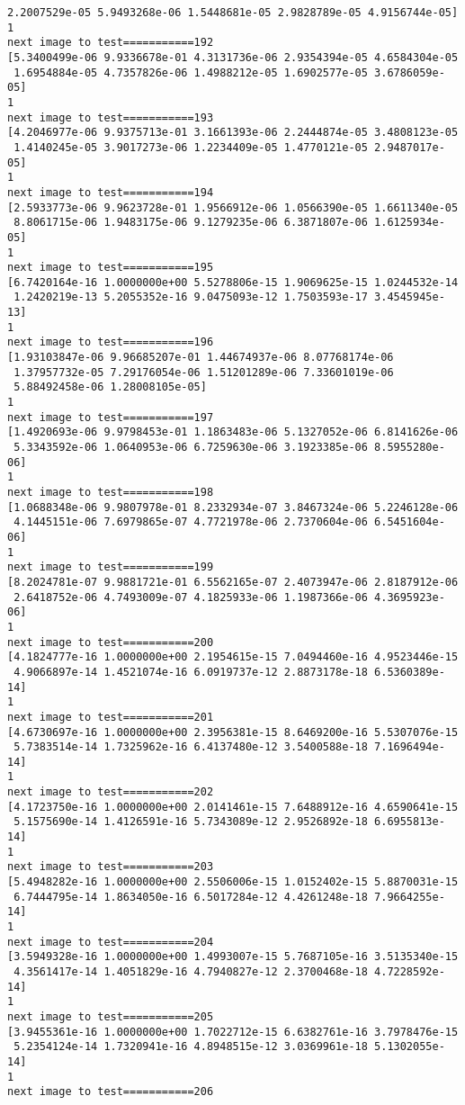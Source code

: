 \documentclass[11pt]{article}
\begin{document}
\begin{Verbatim}[commandchars=\\\{\}]
 2.2007529e-05 5.9493268e-06 1.5448681e-05 2.9828789e-05 4.9156744e-05]
1
next image to test===========192
[5.3400499e-06 9.9336678e-01 4.3131736e-06 2.9354394e-05 4.6584304e-05
 1.6954884e-05 4.7357826e-06 1.4988212e-05 1.6902577e-05 3.6786059e-05]
1
next image to test===========193
[4.2046977e-06 9.9375713e-01 3.1661393e-06 2.2444874e-05 3.4808123e-05
 1.4140245e-05 3.9017273e-06 1.2234409e-05 1.4770121e-05 2.9487017e-05]
1
next image to test===========194
[2.5933773e-06 9.9623728e-01 1.9566912e-06 1.0566390e-05 1.6611340e-05
 8.8061715e-06 1.9483175e-06 9.1279235e-06 6.3871807e-06 1.6125934e-05]
1
next image to test===========195
[6.7420164e-16 1.0000000e+00 5.5278806e-15 1.9069625e-15 1.0244532e-14
 1.2420219e-13 5.2055352e-16 9.0475093e-12 1.7503593e-17 3.4545945e-13]
1
next image to test===========196
[1.93103847e-06 9.96685207e-01 1.44674937e-06 8.07768174e-06
 1.37957732e-05 7.29176054e-06 1.51201289e-06 7.33601019e-06
 5.88492458e-06 1.28008105e-05]
1
next image to test===========197
[1.4920693e-06 9.9798453e-01 1.1863483e-06 5.1327052e-06 6.8141626e-06
 5.3343592e-06 1.0640953e-06 6.7259630e-06 3.1923385e-06 8.5955280e-06]
1
next image to test===========198
[1.0688348e-06 9.9807978e-01 8.2332934e-07 3.8467324e-06 5.2246128e-06
 4.1445151e-06 7.6979865e-07 4.7721978e-06 2.7370604e-06 6.5451604e-06]
1
next image to test===========199
[8.2024781e-07 9.9881721e-01 6.5562165e-07 2.4073947e-06 2.8187912e-06
 2.6418752e-06 4.7493009e-07 4.1825933e-06 1.1987366e-06 4.3695923e-06]
1
next image to test===========200
[4.1824777e-16 1.0000000e+00 2.1954615e-15 7.0494460e-16 4.9523446e-15
 4.9066897e-14 1.4521074e-16 6.0919737e-12 2.8873178e-18 6.5360389e-14]
1
next image to test===========201
[4.6730697e-16 1.0000000e+00 2.3956381e-15 8.6469200e-16 5.5307076e-15
 5.7383514e-14 1.7325962e-16 6.4137480e-12 3.5400588e-18 7.1696494e-14]
1
next image to test===========202
[4.1723750e-16 1.0000000e+00 2.0141461e-15 7.6488912e-16 4.6590641e-15
 5.1575690e-14 1.4126591e-16 5.7343089e-12 2.9526892e-18 6.6955813e-14]
1
next image to test===========203
[5.4948282e-16 1.0000000e+00 2.5506006e-15 1.0152402e-15 5.8870031e-15
 6.7444795e-14 1.8634050e-16 6.5017284e-12 4.4261248e-18 7.9664255e-14]
1
next image to test===========204
[3.5949328e-16 1.0000000e+00 1.4993007e-15 5.7687105e-16 3.5135340e-15
 4.3561417e-14 1.4051829e-16 4.7940827e-12 2.3700468e-18 4.7228592e-14]
1
next image to test===========205
[3.9455361e-16 1.0000000e+00 1.7022712e-15 6.6382761e-16 3.7978476e-15
 5.2354124e-14 1.7320941e-16 4.8948515e-12 3.0369961e-18 5.1302055e-14]
1
next image to test===========206

\end{Verbatim}
\end{document}
